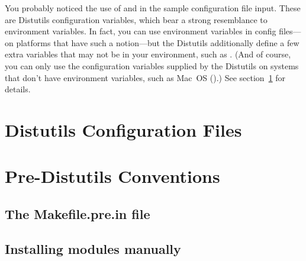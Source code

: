 \documentclass{howto}
\begin{document}
You probably noticed the use of  and  in the
sample configuration file input.  These are Distutils configuration
variables, which bear a strong resemblance to environment variables.  In
fact, you can use environment variables in config files---on platforms
that have such a notion---but the Distutils additionally define a few
extra variables that may not be in your environment, such as
.  (And of course, you can only use the configuration
variables supplied by the Distutils on systems that don't have
environment variables, such as Mac~OS ().)  See
section~\ref{config-files} for details.



\section{Distutils Configuration Files}
\label{config-files}


\section{Pre-Distutils Conventions}
\label{pre-distutils}


\subsection{The Makefile.pre.in file}
\label{makefile-pre-in}


\subsection{Installing modules manually}
\label{manual-install}
\end{document}
